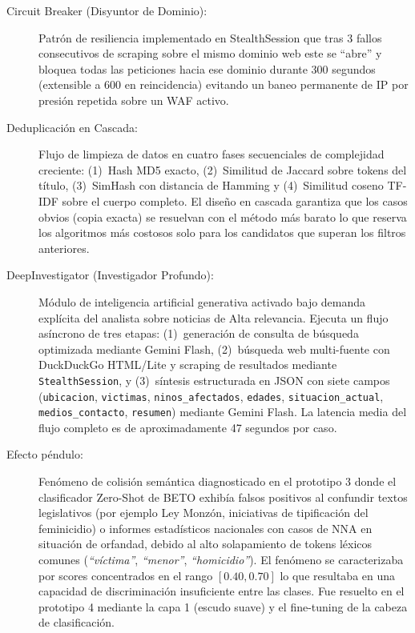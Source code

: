 \begin{description}
    \item[\hypertarget{tCircuitBreaker}{Circuit Breaker (Disyuntor de Dominio):}]
    Patrón de resiliencia implementado en StealthSession que tras 3 fallos
    consecutivos de scraping sobre el mismo dominio web este se ``abre'' y bloquea
    todas las peticiones hacia ese dominio durante 300 segundos (extensible a 600
    en reincidencia) evitando un baneo permanente de IP por presión repetida sobre 
    un WAF activo.

    \item[\hypertarget{tDeduplicacion}{Deduplicación en Cascada:}]
    Flujo de limpieza de datos en cuatro fases secuenciales de complejidad
    creciente: (1)~Hash MD5 exacto, (2)~Similitud de Jaccard sobre
    tokens del título, (3)~SimHash con distancia de Hamming y
    (4)~Similitud coseno TF-IDF sobre el cuerpo completo. El diseño en cascada
    garantiza que los casos obvios (copia exacta) se resuelvan con el método más
    barato lo que reserva los algoritmos más costosos solo para los candidatos que
    superan los filtros anteriores. 

    \item[\hypertarget{tDeepInvestigator}{DeepInvestigator (Investigador Profundo):}]
    Módulo de inteligencia artificial generativa activado bajo demanda explícita
    del analista sobre noticias de Alta relevancia. Ejecuta un flujo asíncrono
    de tres etapas: (1)~generación de consulta de búsqueda optimizada mediante
    Gemini Flash, (2)~búsqueda web multi-fuente con DuckDuckGo HTML/Lite y scraping
    de resultados mediante \texttt{StealthSession}, y (3)~síntesis estructurada en
    JSON con siete campos (\texttt{ubicacion}, \texttt{victimas},
    \texttt{ninos\_afectados}, \texttt{edades}, \texttt{situacion\_actual},
    \texttt{medios\_contacto}, \texttt{resumen}) mediante Gemini Flash.
    La latencia media del flujo completo es de aproximadamente 47 segundos por caso.

    \item[\hypertarget{tEfectoPendulo}{Efecto péndulo:}]
    Fenómeno de colisión semántica diagnosticado en el prototipo 3 donde el
    clasificador Zero-Shot de BETO exhibía falsos positivos al confundir textos
    legislativos (por ejemplo Ley Monzón, iniciativas de tipificación del feminicidio)
    o informes estadísticos nacionales con casos de NNA en situación de orfandad,
    debido al alto solapamiento de tokens léxicos comunes (\textit{``víctima''},
    \textit{``menor''}, \textit{``homicidio''}). El fenómeno se caracterizaba
    por scores concentrados en el rango $[0.40, 0.70]$ lo que resultaba en una
    capacidad de discriminación insuficiente entre las clases. Fue resuelto en el prototipo 4
    mediante la capa 1 (escudo suave) y el fine-tuning de la cabeza de clasificación.


\end{description}
